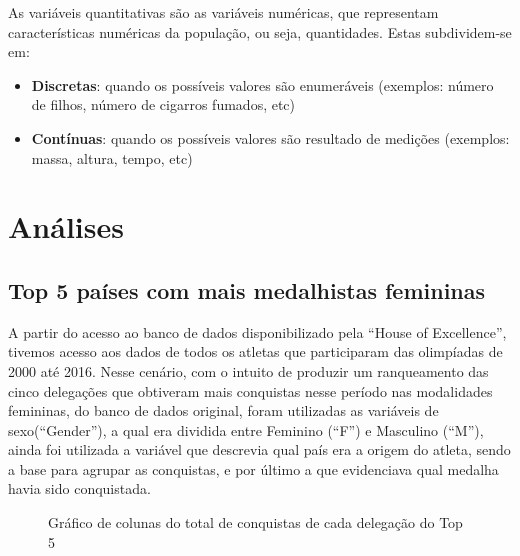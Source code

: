 \documentclass[
]{estat/estat}
\providecommand{\tightlist}{%
  \setlength{\itemsep}{0pt}\setlength{\parskip}{0pt}}\usepackage{longtable,booktabs,array}
\begin{document}
As variáveis quantitativas são as variáveis numéricas, que representam
características numéricas da população, ou seja, quantidades. Estas
subdividem-se em:

\begin{itemize}
\tightlist
\item
  \textbf{Discretas}: quando os possíveis valores são enumeráveis
  (exemplos: número de filhos, número de cigarros fumados, etc)
\item
  \textbf{Contínuas}: quando os possíveis valores são resultado de
  medições (exemplos: massa, altura, tempo, etc)
\end{itemize}

\section{Análises}\label{anuxe1lises}

\subsection{Top 5 países com mais medalhistas
femininas}\label{top-5-pauxedses-com-mais-medalhistas-femininas}

A partir do acesso ao banco de dados disponibilizado pela ``House of
Excellence'', tivemos acesso aos dados de todos os atletas que
participaram das olimpíadas de 2000 até 2016. Nesse cenário, com o
intuito de produzir um ranqueamento das cinco delegações que obtiveram
mais conquistas nesse período nas modalidades femininas, do banco de
dados original, foram utilizadas as variáveis de sexo(``Gender''), a
qual era dividida entre Feminino (``F'') e Masculino (``M''), ainda foi
utilizada a variável que descrevia qual país era a origem do atleta,
sendo a base para agrupar as conquistas, e por último a que evidenciava
qual medalha havia sido conquistada.

\begin{figure}

\caption{\label{fig-prop}Gráfico de colunas do total de conquistas de
cada delegação do Top 5}


\end{figure}%
\end{document}
